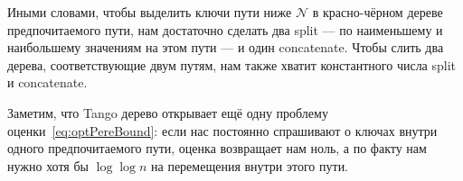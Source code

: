 Иными словами, чтобы выделить ключи пути ниже $\mathcal N$ в красно-чёрном дереве предпочитаемого пути, нам достаточно сделать два split — по наименьшему и наибольшему значениям на этом пути — и один concatenate. Чтобы слить два дерева, соответствующие двум путям, нам также хватит константного числа split и concatenate.

Заметим, что Tango дерево открывает ещё одну проблему оценки~\eqref{eq:optPereBound}: если нас постоянно спрашивают о ключах внутри одного предпочитаемого пути, оценка возвращает нам ноль, а по факту нам нужно хотя бы $\log \log n$ на перемещения внутри этого пути.
